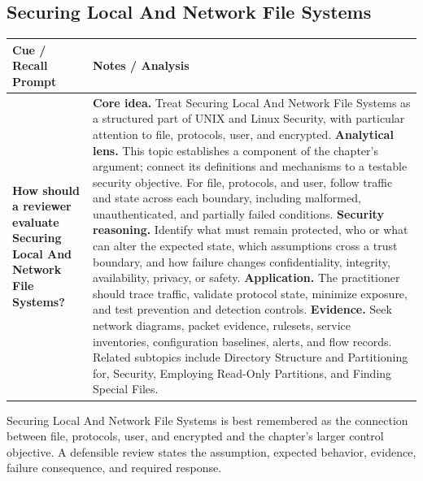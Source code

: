 \documentclass[11pt]{article}
\newcommand{\CornellHeader}{%
\rowcolor{Navy}\color{white}\bfseries Cue / Recall Prompt & \color{white}\bfseries Notes / Analysis\\\hline}
\newcommand{\CornellRow}[2]{%
\cellcolor{CueGray}\RaggedRight\textbf{#1} & \RaggedRight #2\\\hline}
\begin{document}
\subsection*{Securing Local And Network File Systems}
\begin{longtable}{>{\RaggedRight\arraybackslash}p{}|>{\RaggedRight\arraybackslash}p{}}
\CornellHeader
\CornellRow{How should a reviewer evaluate Securing Local And Network File Systems?}{\textbf{Core idea.} Treat Securing Local And Network File Systems as a structured part of UNIX and Linux Security, with particular attention to file, protocols, user, and encrypted. \textbf{Analytical lens.} This topic establishes a component of the chapter's argument; connect its definitions and mechanisms to a testable security objective. For file, protocols, and user, follow traffic and state across each boundary, including malformed, unauthenticated, and partially failed conditions. \textbf{Security reasoning.} Identify what must remain protected, who or what can alter the expected state, which assumptions cross a trust boundary, and how failure changes confidentiality, integrity, availability, privacy, or safety. \textbf{Application.} The practitioner should trace traffic, validate protocol state, minimize exposure, and test prevention and detection controls. \textbf{Evidence.} Seek network diagrams, packet evidence, rulesets, service inventories, configuration baselines, alerts, and flow records. Related subtopics include Directory Structure and Partitioning for, Security, Employing Read-Only Partitions, and Finding Special Files.}
\end{longtable}
\begin{topicsummary}
Securing Local And Network File Systems is best remembered as the connection between file, protocols, user, and encrypted and the chapter's larger control objective. A defensible review states the assumption, expected behavior, evidence, failure consequence, and required response.
\end{topicsummary}
\end{document}
